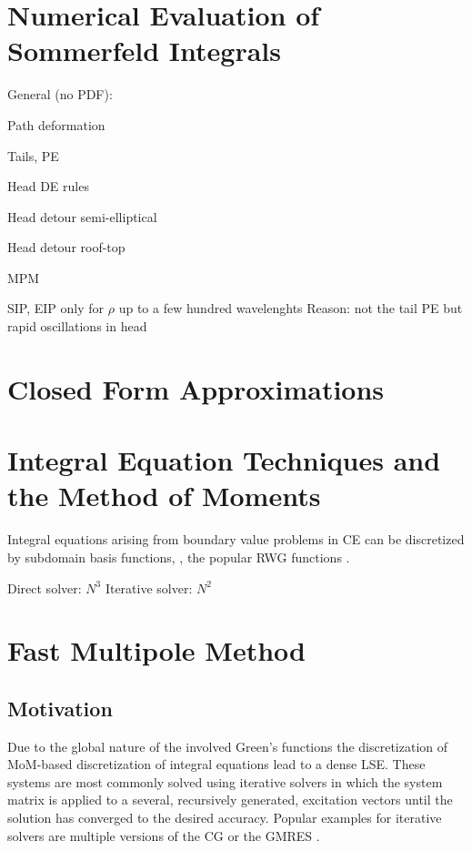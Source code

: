 \section{Numerical Evaluation of Sommerfeld Integrals}

General (no PDF):
\cite{mosig1982}

Path deformation
\cite{Michalski1985a}

Tails, \ac{PE}
\cite{Michalski1998}
\cite{Mosig2012}
\cite{mosig2013}
\cite{Michalski2016a}
\cite{Golubovic2012}

Head DE rules
\cite{golubovicniciforovic2011}

Head detour semi-elliptical
\cite{GayBalmaz1997}

Head detour roof-top
\cite{Michalski2015a}

MPM
\cite{MengtaoYuan2006a}

\ac{SIP}, \ac{EIP} only for $\rho$ up to a few hundred wavelenghts \cite[14]{Michalski2016b}
Reason: not the tail \ac{PE} but rapid oscillations in head

\section{Closed Form Approximations}

\section{Integral Equation Techniques and the Method of Moments}

\cite{Harrington1993}

Integral equations arising from boundary value problems in \ac{CE} can be
discretized by subdomain basis functions, \eg, the popular \ac{RWG} functions
\cite{Rao1982}.

Direct solver: $N^3$
Iterative solver: $N^2$

\section{Fast Multipole Method}

\subsection{Motivation}

Due to the global nature of the involved Green's functions the discretization
of \ac{MoM}-based discretization of integral equations lead to a dense \ac{LSE}.
These systems are most commonly solved using iterative solvers in which the
system matrix is applied to a several, recursively generated, excitation
vectors until the solution has converged to the desired accuracy.
Popular examples for iterative solvers are multiple versions of the \ac{CG}
or the \ac{GMRES} \cite{Strang2010}.

